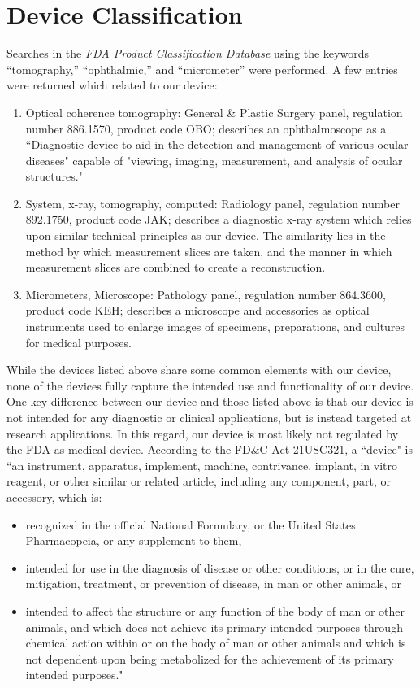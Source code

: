 \documentclass{article}
\begin{document}
\section{Device Classification}
\label{sec:protocols}

Searches in the \textit{FDA Product Classification Database} using the
keywords ``tomography,'' ``ophthalmic,'' and ``micrometer'' were
performed. A few entries were returned which related to our device:

\begin{enumerate}
\item Optical coherence tomography: General \& Plastic Surgery panel,
  regulation number 886.1570, product code OBO; describes an
  ophthalmoscope as a ``Diagnostic device to aid in the detection and
  management of various ocular diseases" capable of "viewing, imaging,
  measurement, and analysis of ocular structures."
\item System, x-ray, tomography, computed: Radiology panel, regulation
  number 892.1750, product code JAK; describes a diagnostic x-ray
  system which relies upon similar technical principles as our
  device. The similarity lies in the method by which measurement
  slices are taken, and the manner in which measurement slices are
  combined to create a reconstruction.
\item Micrometers, Microscope: Pathology panel, regulation number
  864.3600, product code KEH; describes a microscope and accessories
  as optical instruments used to enlarge images of specimens,
  preparations, and cultures for medical purposes.
\end{enumerate}

While the devices listed above share some common elements with our
device, none of the devices fully capture the intended use and
functionality of our device. One key difference between our device and
those listed above is that our device is not intended for any
diagnostic or clinical applications, but is instead targeted at
research applications. In this regard, our device is most likely not
regulated by the FDA as medical device. According to the FD\&C Act
21USC321, a ``device" is ``an instrument, apparatus, implement, machine,
contrivance, implant, in vitro reagent, or other similar or related
article, including any component, part, or accessory, which is:

\begin{itemize}
\item recognized in the official National Formulary, or the United
  States Pharmacopeia, or any supplement to them,
\item intended for use in the diagnosis of disease or other
  conditions, or in the cure, mitigation, treatment, or prevention of
  disease, in man or other animals, or
\item intended to affect the structure or any function of the body of
  man or other animals, and which does not achieve its primary
  intended purposes through chemical action within or on the body of
  man or other animals and which is not dependent upon being
  metabolized for the achievement of its primary intended purposes."
\end{itemize}
\end{document}
